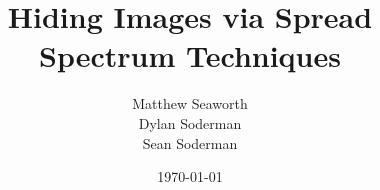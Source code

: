 \documentclass[14]{extarticle}
\begin{document}
\title{Hiding Images via Spread Spectrum Techniques}
\author{Matthew Seaworth \\ Dylan Soderman \\ Sean Soderman}
\date{\today}
\maketitle
\end{document}
